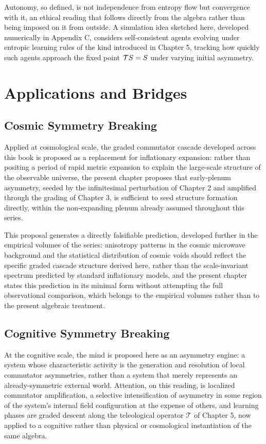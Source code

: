 Autonomy, so defined, is not independence from entropy flow but convergence with it, an ethical reading that follows directly from the algebra rather than being imposed on it from outside. A simulation idea sketched here, developed numerically in Appendix C, considers self-consistent agents evolving under entropic learning rules of the kind introduced in Chapter 5, tracking how quickly such agents approach the fixed point $\mathcal{T}S = S$ under varying initial asymmetry.

\part{Applications and Bridges}

\chapter{Cosmic Symmetry Breaking}

Applied at cosmological scale, the graded commutator cascade developed across this book is proposed as a replacement for inflationary expansion: rather than positing a period of rapid metric expansion to explain the large-scale structure of the observable universe, the present chapter proposes that early-plenum asymmetry, seeded by the infinitesimal perturbation of Chapter 2 and amplified through the grading of Chapter 3, is sufficient to seed structure formation directly, within the non-expanding plenum already assumed throughout this series.

This proposal generates a directly falsifiable prediction, developed further in the empirical volumes of the series: anisotropy patterns in the cosmic microwave background and the statistical distribution of cosmic voids should reflect the specific graded cascade structure derived here, rather than the scale-invariant spectrum predicted by standard inflationary models, and the present chapter states this prediction in its minimal form without attempting the full observational comparison, which belongs to the empirical volumes rather than to the present algebraic treatment.

\chapter{Cognitive Symmetry Breaking}

At the cognitive scale, the mind is proposed here as an asymmetry engine: a system whose characteristic activity is the generation and resolution of local commutator asymmetries, rather than a system that merely represents an already-symmetric external world. Attention, on this reading, is localized commutator amplification, a selective intensification of asymmetry in some region of the system's internal field configuration at the expense of others, and learning phases are graded descent along the teleological operator $\mathcal{T}$ of Chapter 5, now applied to a cognitive rather than physical or cosmological instantiation of the same algebra.

